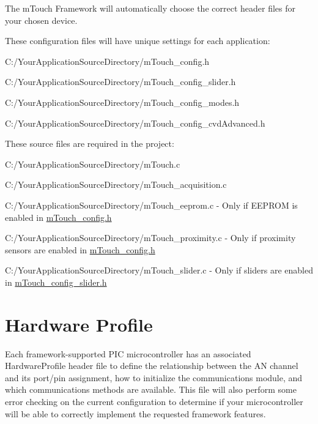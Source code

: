 The m\+Touch Framework will automatically choose the correct header files for your chosen device.

These configuration files will have unique settings for each application\+: \begin{DoxyItemize}
\item C\+:/\+Your\+Application\+Source\+Directory/m\+Touch\+\_\+config.h \item C\+:/\+Your\+Application\+Source\+Directory/m\+Touch\+\_\+config\+\_\+slider.h \item C\+:/\+Your\+Application\+Source\+Directory/m\+Touch\+\_\+config\+\_\+modes.h \item C\+:/\+Your\+Application\+Source\+Directory/m\+Touch\+\_\+config\+\_\+cvd\+Advanced.h\end{DoxyItemize}
These source files are required in the project\+: \begin{DoxyItemize}
\item C\+:/\+Your\+Application\+Source\+Directory/m\+Touch.c \item C\+:/\+Your\+Application\+Source\+Directory/m\+Touch\+\_\+acquisition.c \item C\+:/\+Your\+Application\+Source\+Directory/m\+Touch\+\_\+eeprom.c -\/ Only if E\+E\+P\+R\+O\+M is enabled in \hyperlink{m_touch__config_8h}{m\+Touch\+\_\+config.\+h} \item C\+:/\+Your\+Application\+Source\+Directory/m\+Touch\+\_\+proximity.c -\/ Only if proximity sensors are enabled in \hyperlink{m_touch__config_8h}{m\+Touch\+\_\+config.\+h} \item C\+:/\+Your\+Application\+Source\+Directory/m\+Touch\+\_\+slider.c -\/ Only if sliders are enabled in \hyperlink{m_touch__config__slider_8h}{m\+Touch\+\_\+config\+\_\+slider.\+h}\end{DoxyItemize}
\hypertarget{_required_includes_RI_HardwareProfile}{}\section{Hardware Profile}\label{_required_includes_RI_HardwareProfile}
Each framework-\/supported P\+I\+C microcontroller has an associated Hardware\+Profile header file to define the relationship between the A\+N channel and its port/pin assignment, how to initialize the communications module, and which communications methods are available. This file will also perform some error checking on the current configuration to determine if your microcontroller will be able to correctly implement the requested framework features.

